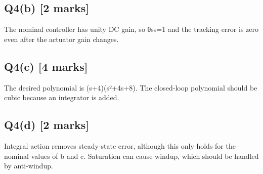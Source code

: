 \documentclass[11pt,a4paper]{article}
\begin{document}
\subsection*{Q4(b) \hfill [2 marks]}

The nominal controller has unity DC gain, so θss=1 and the tracking error is zero even after the actuator gain changes.

\subsection*{Q4(c) \hfill [4 marks]}

The desired polynomial is (s+4)(s²+4s+8).
The closed-loop polynomial should be cubic because an integrator is added.

\subsection*{Q4(d) \hfill [2 marks]}

Integral action removes steady-state error, although this only holds for the nominal values of b and c.
Saturation can cause windup, which should be handled by anti-windup.
\end{document}
